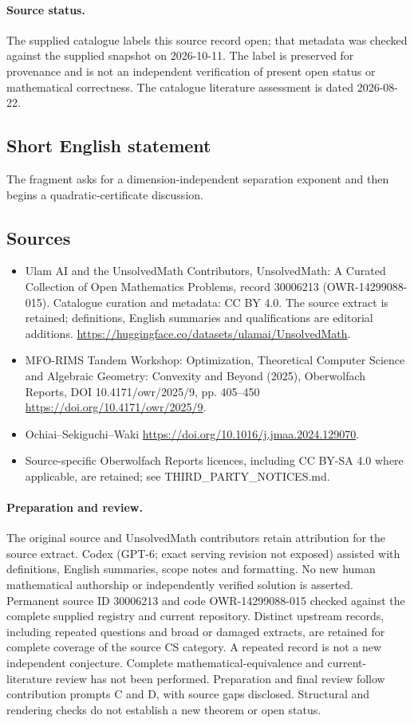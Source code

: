 \documentclass[11pt]{article}
\begin{document}
\paragraph{Source status.}
The supplied catalogue labels this source record open; that metadata was checked against the supplied snapshot on 2026-10-11. The label is preserved for provenance and is not an independent verification of present open status or mathematical correctness. The catalogue literature assessment is dated 2026-08-22.
\subsection{Short English statement}
The fragment asks for a dimension-independent separation exponent and then begins a quadratic-certificate discussion.
\subsection{Sources}
\begin{itemize}
\item[S1] Ulam AI and the UnsolvedMath Contributors, UnsolvedMath: A Curated Collection of Open Mathematics Problems, record 30006213 (OWR-14299088-015). Catalogue curation and metadata: CC BY 4.0. The source extract is retained; definitions, English summaries and qualifications are editorial additions.
\url{https://huggingface.co/datasets/ulamai/UnsolvedMath}.
\item[S2] MFO-RIMS Tandem Workshop: Optimization, Theoretical Computer Science and Algebraic Geometry: Convexity and Beyond (2025), Oberwolfach Reports, DOI 10.4171/owr/2025/9, pp. 405--450
\url{https://doi.org/10.4171/owr/2025/9}.
\item[S3] Ochiai--Sekiguchi--Waki
\url{https://doi.org/10.1016/j.jmaa.2024.129070}.
\item Source-specific Oberwolfach Reports licences, including CC BY-SA 4.0 where applicable, are retained; see THIRD\_PARTY\_NOTICES.md.
\end{itemize}
\paragraph{Preparation and review.}
The original source and UnsolvedMath contributors retain attribution for the source extract. Codex (GPT-6; exact serving revision not exposed) assisted with definitions, English summaries, scope notes and formatting. No new human mathematical authorship or independently verified solution is asserted. Permanent source ID 30006213 and code OWR-14299088-015 checked against the complete supplied registry and current repository. Distinct upstream records, including repeated questions and broad or damaged extracts, are retained for complete coverage of the source CS category. A repeated record is not a new independent conjecture. Complete mathematical-equivalence and current-literature review has not been performed. Preparation and final review follow contribution prompts C and D, with source gaps disclosed. Structural and rendering checks do not establish a new theorem or open status.
\label{end:30006213}
\end{document}
